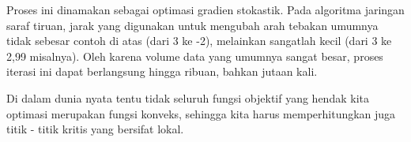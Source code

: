 Proses ini dinamakan sebagai optimasi gradien stokastik. Pada algoritma jaringan saraf tiruan, jarak yang digunakan untuk mengubah arah tebakan umumnya tidak sebesar contoh di atas (dari 3 ke -2), melainkan sangatlah kecil (dari 3 ke 2,99 misalnya). Oleh karena volume data yang umumnya sangat besar, proses iterasi ini dapat berlangsung hingga ribuan, bahkan jutaan kali. 

Di dalam dunia nyata tentu tidak seluruh fungsi objektif yang hendak kita optimasi merupakan fungsi konveks, sehingga kita harus memperhitungkan juga titik - titik kritis yang bersifat lokal.